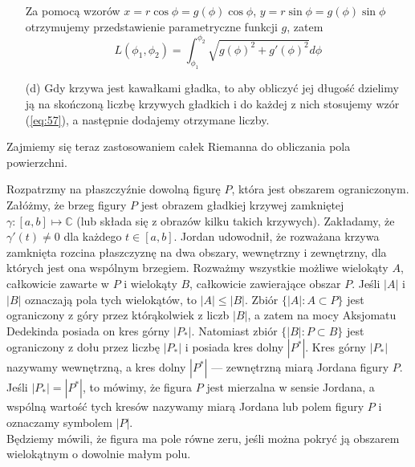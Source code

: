\documentclass[leqno]{article}
\begin{document}
\begin{justify}
\begin{uwaga}
\begin{itemize}
            Za pomocą wzorów $x = r\cos \phi = g(\phi)\cos \phi$, $y = r\sin \phi = g(\phi)\sin \phi$ otrzymujemy przedstawienie parametryczne funkcji $g$, zatem
            \[
                L(\phi_1, \phi_2) = \int_{\phi_1}^{\phi_2} \sqrt{g(\phi)^2 + g'(\phi)^2}d\phi
            \]
        \item [(d)]
            Gdy krzywa jest kawałkami gładka, to aby obliczyć jej długość dzielimy ją na skończoną liczbę krzywych gładkich i do każdej z nich stosujemy wzór (\ref{eq:57}), a następnie dodajemy otrzymane liczby.
    \end{itemize}
\end{uwaga}

Zajmiemy się teraz zastosowaniem całek Riemanna do obliczania pola powierzchni.

\begin{defn}
    Rozpatrzmy na płaszczyźnie dowolną figurę $P$, która jest obszarem ograniczonym. 
    Załóżmy, że brzeg figury $P$ jest obrazem gładkiej krzywej zamkniętej $\gamma : [a,b] \mapsto \mathbb{C}$ (lub składa się z obrazów kilku takich krzywych).
    Zakładamy, że $\gamma'(t) \neq 0$ dla każdego $t \in [a,b]$. Jordan udowodnił, że rozważana krzywa zamknięta rozcina płaszczyznę na dwa obszary,
    wewnętrzny i zewnętrzny, dla których jest ona wspólnym brzegiem. Rozważmy wszystkie możliwe wielokąty $A$, całkowicie zawarte w $P$ i wielokąty $B$, całkowicie zawierające obszar $P$.
    Jeśli $|A|$ i $|B|$ oznaczają pola tych wielokątów, to $|A| \leqslant |B|$. Zbiór $\{|A| : A \subset P\}$ jest ograniczony z góry przez którąkolwiek z liczb $|B|$, a zatem na mocy
    Aksjomatu Dedekinda posiada on kres górny $|P_*|$. Natomiast zbiór $\{|B| : P \subset B\}$ jest ograniczony z dołu przez liczbę $|P_*|$ i posiada kres dolny $|P^*|$. Kres
    górny $|P_*|$ nazywamy wewnętrzną, a kres dolny $|P^*|$ --- zewnętrzną miarą Jordana figury $P$. \\
    Jeśli $|P_*| = |P^*|$, to mówimy, że figura $P$ jest mierzalna w sensie Jordana, a wspólną wartość tych kresów nazywamy miarą Jordana lub polem figury $P$ i oznaczamy symbolem $|P|$. \\
    Będziemy mówili, że figura ma pole równe zeru, jeśli można pokryć ją obszarem wielokątnym o dowolnie małym polu. 
\end{defn}


\end{justify}
\end{document}

